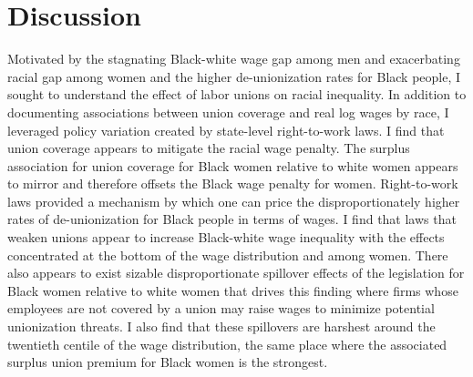 \documentclass[11pt]{article}
\begin{document}

\section{Discussion}\label{sec:disc}
Motivated by the stagnating Black-white wage gap among men and exacerbating racial gap among women and the higher de-unionization rates for Black people, I sought to understand the effect of labor unions on racial inequality. In addition to documenting associations between union coverage and real log wages by race, I leveraged policy variation created by state-level right-to-work laws. I find that union coverage appears to mitigate the racial wage penalty. The surplus association for union coverage for Black women relative to white women appears to mirror and therefore offsets the Black wage penalty for women. Right-to-work laws provided a mechanism by which one can price the disproportionately higher rates of de-unionization for Black people in terms of wages. I find that laws that weaken unions appear to increase Black-white wage inequality with the effects concentrated at the bottom of the wage distribution and among women. There also appears to exist sizable disproportionate spillover effects of the legislation for Black women relative to white women that drives this finding where firms whose employees are not covered by a union may raise wages to minimize potential unionization threats. I also find that these spillovers are harshest around the twentieth centile of the wage distribution, the same place where the associated surplus union premium for Black women is the strongest.
\end{document}
